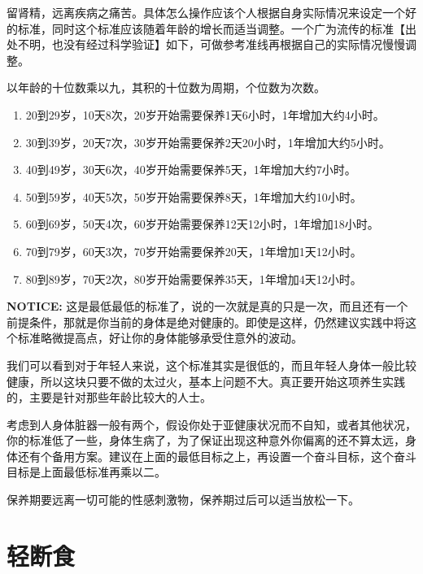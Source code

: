 \documentclass[12pt,oneside]{book}
\begin{document}
留肾精，远离疾病之痛苦。具体怎么操作应该个人根据自身实际情况来设定一个好的标准，同时这个标准应该随着年龄的增长而适当调整。一个广为流传的标准【出处不明，也没有经过科学验证】如下，可做参考准线再根据自己的实际情况慢慢调整。

以年龄的十位数乘以九，其积的十位数为周期，个位数为次数。

\begin{enumerate}
\item 20到29岁，10天8次，20岁开始需要保养1天6小时，1年增加大约4小时。
\item 30到39岁，20天7次，30岁开始需要保养2天20小时，1年增加大约5小时。
\item 40到49岁，30天6次，40岁开始需要保养5天，1年增加大约7小时。
\item 50到59岁，40天5次，50岁开始需要保养8天，1年增加大约10小时。
\item 60到69岁，50天4次，60岁开始需要保养12天12小时，1年增加18小时。
\item 70到79岁，60天3次，70岁开始需要保养20天，1年增加1天12小时。
\item 80到89岁，70天2次，80岁开始需要保养35天，1年增加4天12小时。
\end{enumerate}

\textbf{NOTICE:} 这是最低最低的标准了，说的一次就是真的只是一次，而且还有一个前提条件，那就是你当前的身体是绝对健康的。即使是这样，仍然建议实践中将这个标准略微提高点，好让你的身体能够承受住意外的波动。

我们可以看到对于年轻人来说，这个标准其实是很低的，而且年轻人身体一般比较健康，所以这块只要不做的太过火，基本上问题不大。真正要开始这项养生实践的，主要是针对那些年龄比较大的人士。

考虑到人身体脏器一般有两个，假设你处于亚健康状况而不自知，或者其他状况，你的标准低了一些，身体生病了，为了保证出现这种意外你偏离的还不算太远，身体还有个备用方案。建议在上面的最低目标之上，再设置一个奋斗目标，这个奋斗目标是上面最低标准再乘以二。

保养期要远离一切可能的性感刺激物，保养期过后可以适当放松一下。


\chapter{轻断食}
\end{document}
